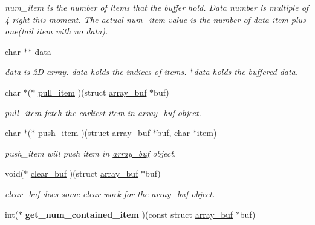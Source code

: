 \begin{DoxyCompactItemize}
\begin{DoxyCompactList}\small\item\em num\+\_\+item is the number of items that the buffer hold. Data number is multiple of 4 right this moment. The actual num\+\_\+item value is the number of data item plus one(tail item with no data). \end{DoxyCompactList}\item 
\hypertarget{structarray__buf_adb2440bd07023c1957827083d1735432}{}char $\ast$$\ast$ \hyperlink{structarray__buf_adb2440bd07023c1957827083d1735432}{data}\label{structarray__buf_adb2440bd07023c1957827083d1735432}

\begin{DoxyCompactList}\small\item\em data is 2\+D array. data holds the indices of items. $\ast$data holds the buffered data. \end{DoxyCompactList}\item 
char $\ast$($\ast$ \hyperlink{structarray__buf_a0b51cb106346823cf7fb861d1d2b5359}{pull\+\_\+item} )(struct \hyperlink{structarray__buf}{array\+\_\+buf} $\ast$buf)
\begin{DoxyCompactList}\small\item\em pull\+\_\+item fetch the earliest item in \hyperlink{structarray__buf}{array\+\_\+buf} object. \end{DoxyCompactList}\item 
char $\ast$($\ast$ \hyperlink{structarray__buf_ab90bdd641479ac916d653df2c3688ebf}{push\+\_\+item} )(struct \hyperlink{structarray__buf}{array\+\_\+buf} $\ast$buf, char $\ast$item)
\begin{DoxyCompactList}\small\item\em push\+\_\+item will push item in \hyperlink{structarray__buf}{array\+\_\+buf} object. \end{DoxyCompactList}\item 
void($\ast$ \hyperlink{structarray__buf_af0c784332c37e64228d9ee80cc0bdaed}{clear\+\_\+buf} )(struct \hyperlink{structarray__buf}{array\+\_\+buf} $\ast$buf)
\begin{DoxyCompactList}\small\item\em clear\+\_\+buf does some clear work for the \hyperlink{structarray__buf}{array\+\_\+buf} object. \end{DoxyCompactList}\item 
\hypertarget{structarray__buf_ac82dad3541bb02ffffea44b7809ce6b9}{}int($\ast$ {\bfseries get\+\_\+num\+\_\+contained\+\_\+item} )(const struct \hyperlink{structarray__buf}{array\+\_\+buf} $\ast$buf)\label{structarray__buf_ac82dad3541bb02ffffea44b7809ce6b9}

\end{DoxyCompactItemize}


